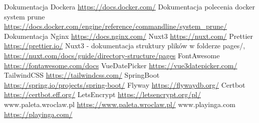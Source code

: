 \documentclass[shortabstract]{iithesis}
\begin{document}
\label{subsec:Certbot}


\begin{thebibliography}{1}
     Dokumentacja Dockera \url{https://docs.docker.com/}
     Dokumentacja polecenia docker system prune \url{https://docs.docker.com/engine/reference/commandline/system_prune/}
     Dokumentacja Nginx \url{https://docs.nginx.com/}
     Nuxt3 \url{https://nuxt.com/}
     Prettier \url{https://prettier.io/}
     Nuxt3 - dokumentacja struktury plików w folderze pages/, \url{https://nuxt.com/docs/guide/directory-structure/pages}
     FontAwesome \url{https://fontawesome.com/docs}
     VueDatePicker \url{https://vue3datepicker.com/}
     TailwindCSS \url{https://tailwindcss.com/}
     SpringBoot \url{https://spring.io/projects/spring-boot/}
     Flyway \url{https://flywaydb.org/}
     Certbot \url{https://certbot.eff.org/}
     LetsEncrypt \url{https://letsencrypt.org/pl/}
     www.paleta.wroclaw.pl \url{https://www.paleta.wroclaw.pl/}
     www.playinga.com \url{https://playinga.com/}
\end{thebibliography}
\end{document}
